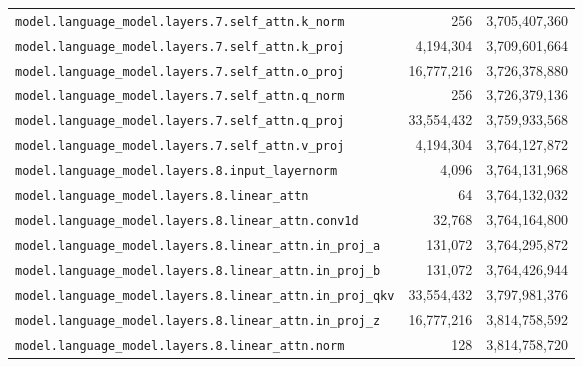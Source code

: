 \documentclass[10pt,a4paper]{article}
\theoremstyle{definition}
\begin{document}
\begin{appendices}
\begin{longtable}{p{9.5cm}rr}
\texttt{model.\allowbreak{}language\_model.\allowbreak{}layers.\allowbreak{}7.\allowbreak{}self\_attn.\allowbreak{}k\_norm} & 256 & 3,705,407,360 \\
\texttt{model.\allowbreak{}language\_model.\allowbreak{}layers.\allowbreak{}7.\allowbreak{}self\_attn.\allowbreak{}k\_proj} & 4,194,304 & 3,709,601,664 \\
\texttt{model.\allowbreak{}language\_model.\allowbreak{}layers.\allowbreak{}7.\allowbreak{}self\_attn.\allowbreak{}o\_proj} & 16,777,216 & 3,726,378,880 \\
\texttt{model.\allowbreak{}language\_model.\allowbreak{}layers.\allowbreak{}7.\allowbreak{}self\_attn.\allowbreak{}q\_norm} & 256 & 3,726,379,136 \\
\texttt{model.\allowbreak{}language\_model.\allowbreak{}layers.\allowbreak{}7.\allowbreak{}self\_attn.\allowbreak{}q\_proj} & 33,554,432 & 3,759,933,568 \\
\texttt{model.\allowbreak{}language\_model.\allowbreak{}layers.\allowbreak{}7.\allowbreak{}self\_attn.\allowbreak{}v\_proj} & 4,194,304 & 3,764,127,872 \\
\texttt{model.\allowbreak{}language\_model.\allowbreak{}layers.\allowbreak{}8.\allowbreak{}input\_layernorm} & 4,096 & 3,764,131,968 \\
\texttt{model.\allowbreak{}language\_model.\allowbreak{}layers.\allowbreak{}8.\allowbreak{}linear\_attn} & 64 & 3,764,132,032 \\
\texttt{model.\allowbreak{}language\_model.\allowbreak{}layers.\allowbreak{}8.\allowbreak{}linear\_attn.\allowbreak{}conv1d} & 32,768 & 3,764,164,800 \\
\texttt{model.\allowbreak{}language\_model.\allowbreak{}layers.\allowbreak{}8.\allowbreak{}linear\_attn.\allowbreak{}in\_proj\_a} & 131,072 & 3,764,295,872 \\
\texttt{model.\allowbreak{}language\_model.\allowbreak{}layers.\allowbreak{}8.\allowbreak{}linear\_attn.\allowbreak{}in\_proj\_b} & 131,072 & 3,764,426,944 \\
\texttt{model.\allowbreak{}language\_model.\allowbreak{}layers.\allowbreak{}8.\allowbreak{}linear\_attn.\allowbreak{}in\_proj\_qkv} & 33,554,432 & 3,797,981,376 \\
\texttt{model.\allowbreak{}language\_model.\allowbreak{}layers.\allowbreak{}8.\allowbreak{}linear\_attn.\allowbreak{}in\_proj\_z} & 16,777,216 & 3,814,758,592 \\
\texttt{model.\allowbreak{}language\_model.\allowbreak{}layers.\allowbreak{}8.\allowbreak{}linear\_attn.\allowbreak{}norm} & 128 & 3,814,758,720 \\

\end{longtable}
\end{appendices}
\end{document}

